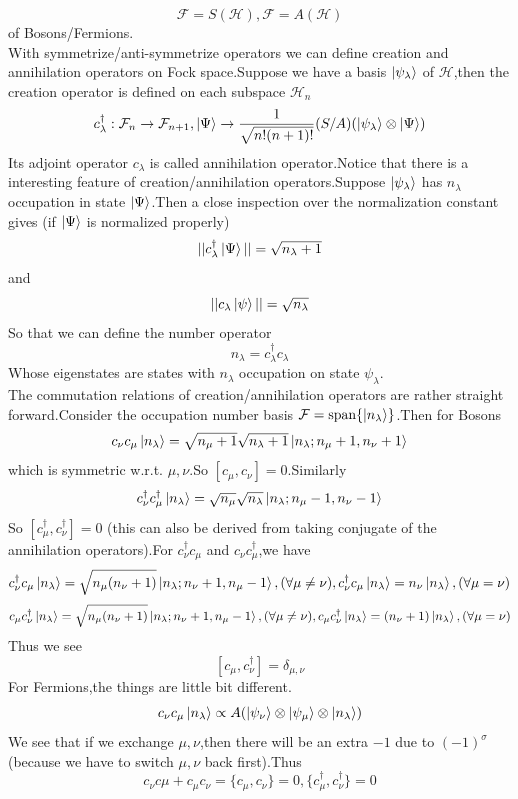 \documentclass[a4paper,12pt]{article}
\theoremstyle{mystyle}
\theoremstyle{mystyle}
\numberwithin{equation}{section}
\begin{document}
	$$\mathcal{F}=S(\mathcal{H}),\mathcal{F}=A(\mathcal{H})$$
	of Bosons/Fermions.
	\\
	With symmetrize/anti-symmetrize operators we can define creation and annihilation operators on Fock space.Suppose we have a basis $\ket{\psi_\lambda}$ of $\mathcal{H}$,then the creation operator is defined on each subspace $\mathcal{H}_n$
	$$c^\dagger_\lambda:\mathcal{F}_n\to \mathcal{F}_{n+1},\ket{\Psi}\to \frac{1}{\sqrt{n!(n+1)!}}(S/A)(\ket{\psi_\lambda}\otimes \ket{\Psi})$$
	Its adjoint operator $c_\lambda$ is called annihilation operator.Notice that there is a interesting feature of creation/annihilation operators.Suppose $\ket{\psi_\lambda}$ has $n_\lambda$ occupation in state $\ket{\Psi}$.Then a close inspection over the normalization constant gives (if $\ket{\Psi}$ is normalized properly)
	$$||c_\lambda^\dagger\ket{\Psi}||=\sqrt{n_\lambda+1}$$
	and
	$$||c_\lambda \ket{\psi}||=\sqrt{n_\lambda}$$
	So that we can define the number operator
	$$n_\lambda =c^\dagger_\lambda c_\lambda$$
	Whose eigenstates are states with $n_\lambda$ occupation on state $\psi_\lambda$.
	\\
	The commutation relations of creation/annihilation operators are rather straight forward.Consider the occupation number basis $\mathcal{F}=\text{span}\{\ket{n_\lambda}\}$.Then for Bosons
	$$c_\nu c_\mu\ket{n_\lambda}=\sqrt{n_\mu+1}\sqrt{n_\lambda+1}\ket{n_\lambda;n_\mu+1,n_\nu+1}$$
	which is symmetric w.r.t. $\mu,\nu$.So $[c_\mu,c_\nu]=0$.Similarly
	$$c^\dagger_\nu c^\dagger_\mu\ket{n_\lambda}=\sqrt{n_\mu}\sqrt{n_\lambda}\ket{n_\lambda;n_\mu-1,n_\nu-1}$$
	So $[c^\dagger_\mu,c^\dagger_\nu]=0$ (this can also be derived from taking conjugate of the annihilation operators).For $c_\nu^\dagger c_\mu$ and $c_\nu c_\mu^\dagger$,we have
	$$c_\nu^\dagger c_\mu\ket{n_\lambda}=\sqrt{n_\mu(n_\nu+1)}\ket{n_\lambda;n_\nu+1,n_\mu-1},(\forall \mu\neq \nu),c_\nu^\dagger c_\mu\ket{n_\lambda}=n_\nu\ket{n_\lambda},(\forall \mu=\nu)$$
	$$c_\mu c_\nu^\dagger\ket{n_\lambda}=\sqrt{n_\mu(n_\nu+1)}\ket{n_\lambda;n_\nu+1,n_\mu-1},(\forall \mu\neq \nu),c_\mu c_\nu^\dagger\ket{n_\lambda}=(n_\nu+1)\ket{n_\lambda},(\forall \mu=\nu)$$
	Thus we see
	$$[c_\mu,c_\nu^\dagger]=\delta_{\mu,\nu}$$
	For Fermions,the things are little bit different.
	$$c_\nu c_\mu\ket{n_\lambda}\propto A(\ket{\psi_\nu}\otimes \ket{\psi_\mu}\otimes \ket{n_\lambda})$$
	We see that if we exchange $\mu,\nu$,then there will be an extra $-1$ due to $(-1)^\sigma$ (because we have to switch $\mu,\nu$ back first).Thus
	$$c_\nu c\mu+c_\mu c_\nu=\{c_\mu,c_\nu\}=0,\{c_\mu^\dagger,c_\nu^\dagger\}=0$$
\end{document}
